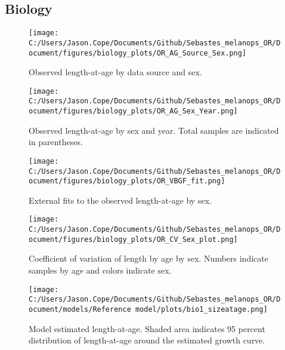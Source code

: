 \documentclass[11pt,
  letterpaper,
]{article}
\begin{document}
\newpage

\hypertarget{biology}{%
\subsection{Biology}\label{biology}}

\begin{figure}
{\centering
\texttt{[image: C:/Users/Jason.Cope/Documents/Github/Sebastes\_melanops\_OR/Document/figures/biology\_plots/OR\_AG\_Source\_Sex.png]}
}
\caption{Observed length-at-age by data source and sex.\label{fig:len-age-data-sex}}
\end{figure}

\newpage

\begin{figure}
{\centering
\texttt{[image: C:/Users/Jason.Cope/Documents/Github/Sebastes\_melanops\_OR/Document/figures/biology\_plots/OR\_AG\_Sex\_Year.png]}
}
\caption{Observed length-at-age by sex and year. Total samples are indicated in parentheses.\label{fig:len-age-sex-year}}
\end{figure}

\newpage

\begin{figure}
{\centering
\texttt{[image: C:/Users/Jason.Cope/Documents/Github/Sebastes\_melanops\_OR/Document/figures/biology\_plots/OR\_VBGF\_fit.png]}
}
\caption{External fits to the observed length-at-age by sex.\label{fig:len-age-fit}}
\end{figure}

\newpage

\begin{figure}
{\centering
\texttt{[image: C:/Users/Jason.Cope/Documents/Github/Sebastes\_melanops\_OR/Document/figures/biology\_plots/OR\_CV\_Sex\_plot.png]}
}
\caption{Coefficient of variation of length by age by sex. Numbers indicate samples by age and colors indicate sex.\label{fig:cv-lt-age}}
\end{figure}

\newpage

\begin{figure}
{\centering
\texttt{[image: C:/Users/Jason.Cope/Documents/Github/Sebastes\_melanops\_OR/Document/models/Reference model/plots/bio1\_sizeatage.png]}
}
\caption{Model estimated length-at-age. Shaded area indicates 95 percent distribution of length-at-age around the estimated growth curve.\label{fig:len-age-ss}}
\end{figure}
\end{document}
